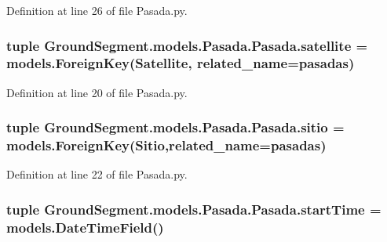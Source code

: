 Definition at line 26 of file Pasada.\+py.

\hypertarget{class_ground_segment_1_1models_1_1_pasada_1_1_pasada_aff2cf52f9825341a81fb40b46ad003ea}{}
\subsubsection[{satellite}]{\setlength{\rightskip}{0pt plus 5cm}tuple Ground\+Segment.\+models.\+Pasada.\+Pasada.\+satellite = models.\+Foreign\+Key({\bf Satellite}, related\+\_\+name=\textquotesingle{}pasadas\textquotesingle{})\hspace{0.3cm}{\ttfamily [static]}}\label{class_ground_segment_1_1models_1_1_pasada_1_1_pasada_aff2cf52f9825341a81fb40b46ad003ea}


Definition at line 20 of file Pasada.\+py.

\hypertarget{class_ground_segment_1_1models_1_1_pasada_1_1_pasada_a11b3cdc3860dfd371e447d34fe002767}{}
\subsubsection[{sitio}]{\setlength{\rightskip}{0pt plus 5cm}tuple Ground\+Segment.\+models.\+Pasada.\+Pasada.\+sitio = models.\+Foreign\+Key({\bf Sitio},related\+\_\+name=\textquotesingle{}pasadas\textquotesingle{})\hspace{0.3cm}{\ttfamily [static]}}\label{class_ground_segment_1_1models_1_1_pasada_1_1_pasada_a11b3cdc3860dfd371e447d34fe002767}


Definition at line 22 of file Pasada.\+py.

\hypertarget{class_ground_segment_1_1models_1_1_pasada_1_1_pasada_abceb32f3eb016d4e6d2bee806204242b}{}
\subsubsection[{start\+Time}]{\setlength{\rightskip}{0pt plus 5cm}tuple Ground\+Segment.\+models.\+Pasada.\+Pasada.\+start\+Time = models.\+Date\+Time\+Field()\hspace{0.3cm}{\ttfamily [static]}}\label{class_ground_segment_1_1models_1_1_pasada_1_1_pasada_abceb32f3eb016d4e6d2bee806204242b}


